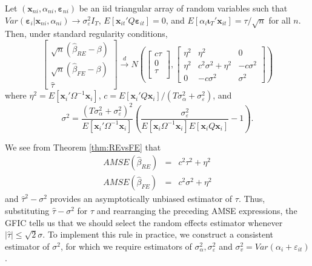 \begin{thm}
\label{thm:REvsFE}
  Let $\left( \mathbf{x}_{ni}, \alpha_{ni}, \boldsymbol{\varepsilon}_{ni} \right)$ be an iid triangular array of random variables such that $Var(\boldsymbol{\varepsilon}_i|\mathbf{x}_{ni},\alpha_{ni})\rightarrow \sigma_{\varepsilon}^2 I_T$, $E[\mathbf{x}_{it}'Q\boldsymbol{\varepsilon}_{it}]=0$, and $E\left[ \alpha_i \boldsymbol{\iota}_T'\mathbf{x}_{it} \right]=\tau/\sqrt{n}$ for all $n$.
  Then, under standard regularity conditions,
\[
  \left[\begin{array}{c}
\sqrt{n} (\widehat{\beta}_{RE} - \beta)\\
\sqrt{n} (\widehat{\beta}_{FE} - \beta)\\
\widehat{\tau}
\end{array}\right] \overset{d}{\rightarrow} N \left( 
\left[\begin{array}{c}
c\tau \\
0  \\
\tau\\
\end{array}\right],  
\left[\begin{array}{ccc}
\eta^2 & \eta^2 & 0 \\
\eta^2 & c^2\sigma^2 + \eta^2 & -c\sigma^2\\ 
0 & -c\sigma^2 & \sigma^2
\end{array}\right] \right)
\]
where $\eta^2 = E[\mathbf{x}_i'\Omega^{-1}\mathbf{x}_i]$, $c = E[\mathbf{x}_i' Q \mathbf{x}_i]/(T\sigma_\alpha^2 + \sigma_\varepsilon^2)$, and
\[\sigma^2 = \frac{(T\sigma_{\alpha}^2 + \sigma_{\varepsilon}^2)^2}{E\left[ \mathbf{x}_i'\Omega^{-1}\mathbf{x}_i \right]}\left( \frac{\sigma_{\varepsilon}^2}{E\left[ \mathbf{x}_i \Omega^{-1} \mathbf{x}_i \right]E\left[ \mathbf{x}_i Q \mathbf{x}_i \right]} - 1 \right). \]
\end{thm}
We see from Theorem \ref{thm:REvsFE} that 
\begin{eqnarray*}
  AMSE(\widehat{\beta}_{RE}) &=& c^2 \tau^2 + \eta^2 \\
  AMSE(\widehat{\beta}_{FE}) &=& c^2\sigma^2 + \eta^2  
\end{eqnarray*}
and $\widehat{\tau}^2 - \sigma^2$ provides an asymptotically unbiased estimator of $\tau$.
Thus, substituting $\widehat{\tau} - \sigma^2$ for $\tau$ and rearranging the preceding AMSE expressions, the GFIC tells us that we should select the random effects estimator whenever $|\widehat{\tau}|\leq \sqrt{2} \sigma$.
To implement this rule in practice, we construct a consistent estimator of $\sigma^2$, for which we require estimators of $\sigma_{\alpha}^2, \sigma_{\varepsilon}^2$ and $\sigma_{v}^2 = Var(\alpha_i + \varepsilon_{it})$.
